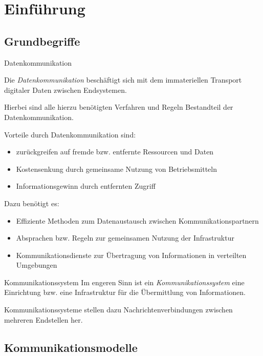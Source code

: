 \section{Einführung}

\subsection{Grundbegriffe}

\begin{defi}{Datenkommunikation}

    Die \emph{Datenkommunikation} beschäftigt sich mit dem immateriellen Transport digitaler Daten zwischen Endsystemen.

    Hierbei sind alle hierzu benötigten Verfahren und Regeln Bestandteil der Datenkommunikation.

    Vorteile durch Datenkommunikation sind:
    \begin{itemize}
        \item zurückgreifen auf fremde bzw. entfernte Ressourcen und Daten
        \item Kostensenkung durch gemeinsame Nutzung von Betriebsmitteln
        \item Informationsgewinn durch entfernten Zugriff
    \end{itemize}

    Dazu benötigt es:
    \begin{itemize}
        \item Effiziente Methoden zum Datenaustausch zwischen Kommunikationspartnern
        \item Absprachen bzw. Regeln zur gemeinsamen Nutzung der Infrastruktur
        \item Kommunikationsdienste zur Übertragung von Informationen in verteilten Umgebungen
    \end{itemize}
\end{defi}

\begin{defi}{Kommunikationssystem}
    Im engeren Sinn ist ein \emph{Kommunikationssystem} eine Einrichtung bzw. eine Infrastruktur für die Übermittlung von Informationen.

    Kommunikationssysteme stellen dazu Nachrichtenverbindungen zwischen mehreren Endstellen her.
\end{defi}

\subsection{Kommunikationsmodelle}

